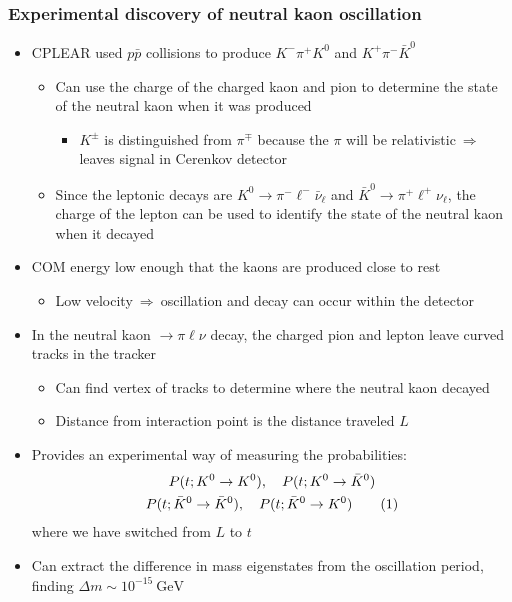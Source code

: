 \documentclass[11pt]{article}
\newcommand\numberthis{\addtocounter{equation}{1}\tag{\theequation}}
\newcommand{\nubar}{{\bar{\nu}}}
\newcommand{\gev}{\text{GeV}}
\newcommand{\thus}{\ensuremath{~\Rightarrow~}}
\begin{document}
\subsubsection{Experimental discovery of neutral kaon oscillation}
\begin{itemize}
  \item CPLEAR used $p\bar p$ collisions to produce $K^- \pi^+ K^0$ and $K^+ \pi^- \bar K^0$
  \begin{itemize}
    \item Can use the charge of the charged kaon and pion to determine the state of the neutral kaon when it was produced
    \begin{itemize}
      \item $K^\pm$ is distinguished from $\pi^\mp$ because the $\pi$ will be relativistic\thus leaves signal in Cerenkov detector
    \end{itemize}
    \item Since the leptonic decays are $K^0 \rightarrow \pi^- \ell^-\nubar_\ell $ and $\bar K^0 \rightarrow \pi^+ \ell^+ \nu_\ell$, the charge of the lepton can be used to identify the state of the neutral kaon when it decayed
  \end{itemize}
  \item COM energy low enough that the kaons are produced close to rest 
  \begin{itemize}
    \item Low velocity\thus oscillation and decay can occur within the detector
  \end{itemize}
  \item In the neutral kaon $\rightarrow \pi \ell \nu$ decay, the charged pion and lepton leave curved tracks in the tracker
  \begin{itemize}
    \item Can find vertex of tracks to determine where the neutral kaon decayed
    \item Distance from interaction point is the distance traveled $L$
  \end{itemize}
  \item Provides an experimental way of measuring the probabilities:
  \begin{gather*}
    P(t; K^0\rightarrow K^0), \quad P(t; K^0\rightarrow \bar K^0)\\
    P(t; \bar K^0\rightarrow \bar K^0), \quad P(t; \bar K^0\rightarrow K^0)\numberthis
  \end{gather*}
  where we have switched from $L$ to $t$
  \item Can extract the difference in mass eigenstates from the oscillation period, finding $\Delta m \sim 10^{-15}~\gev$
\end{itemize}
\end{document}
